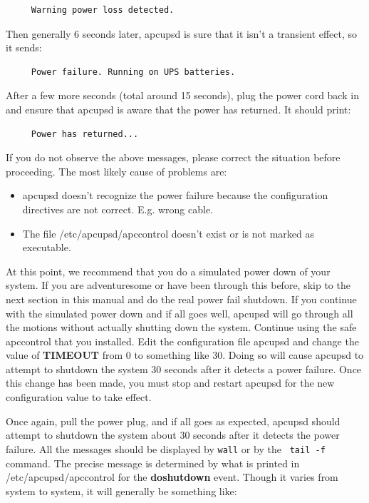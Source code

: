 \footnotesize
\begin{verbatim}
     Warning power loss detected.
\end{verbatim}
\normalsize

Then generally 6 seconds later, apcupsd is sure that it isn't a transient
effect, so it sends: 

\footnotesize
\begin{verbatim}
     Power failure. Running on UPS batteries.
\end{verbatim}
\normalsize

After a few more seconds (total around 15 seconds), plug the power cord back
in and ensure that apcupsd is aware that the power has returned. It should
print: 

\footnotesize
\begin{verbatim}
     Power has returned...
\end{verbatim}
\normalsize

If you do not observe the above messages, please correct the situation before
proceeding. The most likely cause of problems are:  

\begin{itemize}
\item apcupsd doesn't recognize the power failure because the configuration
   directives are not correct. E.g. wrong cable.  
\item The file /etc/apcupsd/apccontrol doesn't exist or is not marked as
   executable. 
   \end{itemize}

At this point, we recommend that you do a simulated power down of your system.
If you are adventuresome or have been through this before, skip to the next
section in this manual and do the real power fail shutdown. If you continue
with the simulated power down and if all goes well, apcupsd will go through
all the motions without actually shutting down the system. Continue using the
safe apccontrol that you installed. Edit the configuration file apcupsd and
change the value of {\bf TIMEOUT} from 0 to something like 30. Doing so will
cause apcupsd to attempt to shutdown the system 30 seconds after it detects a
power failure. Once this change has been made, you must stop and restart
apcupsd for the new configuration value to take effect.  

Once again, pull the power plug, and if all goes as expected, apcupsd should
attempt to shutdown the system about 30 seconds after it detects the power
failure. All the messages should be displayed by {\tt wall} or by the {\tt
tail -f} command. The precise message is determined by what is printed in
/etc/apcupsd/apccontrol for the {\bf doshutdown} event.  Though it varies from
system to system, it will generally be something like: 

